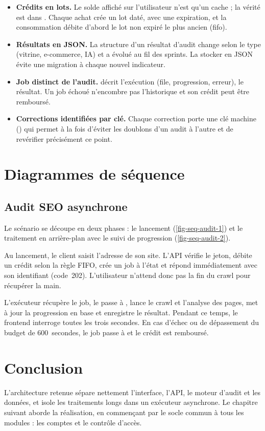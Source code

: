 \begin{itemize}
  \item \textbf{Crédits en lots.} Le solde affiché sur l'utilisateur n'est qu'un cache ; la vérité est dans . Chaque achat crée un lot daté, avec une expiration, et la consommation débite d'abord le lot non expiré le plus ancien (\gls{fifo}).
  \item \textbf{Résultats en JSON.} La structure d'un résultat d'audit change selon le type (vitrine, e-commerce, IA) et a évolué au fil des sprints. La stocker en JSON évite une migration à chaque nouvel indicateur.
  \item \textbf{Job distinct de l'audit.}  décrit l'exécution (file, progression, erreur),  le résultat. Un job échoué n'encombre pas l'historique et son crédit peut être remboursé.
  \item \textbf{Corrections identifiées par clé.} Chaque correction porte une clé machine () qui permet à la fois d'éviter les doublons d'un audit à l'autre et de revérifier précisément ce point.
\end{itemize}

\section{Diagrammes de séquence}

\subsection{Audit SEO asynchrone}
Le scénario se découpe en deux phases : le lancement (\cref{fig-seq-audit-1}) et le traitement en arrière-plan avec le suivi de progression (\cref{fig-seq-audit-2}).


Au lancement, le client saisit l'adresse de son site. L'API vérifie le jeton, débite un crédit selon la règle FIFO, crée un job à l'état  et répond immédiatement avec son identifiant (code~202). L'utilisateur n'attend donc pas la fin du crawl pour récupérer la main.


L'exécuteur récupère le job, le passe à , lance le crawl et l'analyse des pages, met à jour la progression en base et enregistre le résultat. Pendant ce temps, le frontend interroge  toutes les trois secondes. En cas d'échec ou de dépassement du budget de 600~secondes, le job passe à  et le crédit est remboursé.

\section{Conclusion}
L'architecture retenue sépare nettement l'interface, l'API, le moteur d'audit et les données, et isole les traitements longs dans un exécuteur asynchrone. Le chapitre suivant aborde la réalisation, en commençant par le socle commun à tous les modules : les comptes et le contrôle d'accès.
